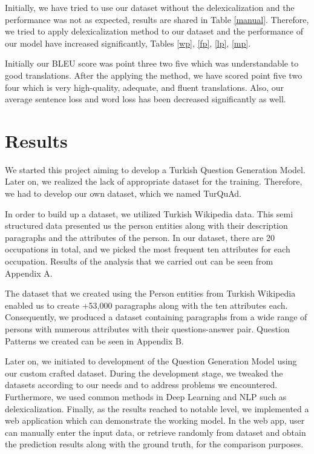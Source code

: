 \documentclass{mefsdp}
\begin{document}
Initially, we have tried to use our dataset without the delexicalization and the performance was not as expected, results are shared in Table \ref{manual}. Therefore, we tried to apply delexicalization method to our dataset and the performance of our model have increased significantly, Tables \ref{wp}, \ref{fp}, \ref{lp}, \ref{mp}.\newline \par 

Initially our BLEU score was point three two five which was understandable to good translations. After the applying the method, we have scored point five two four which is very high-quality, adequate, and fluent translations. Also, our average sentence loss and word loss has been decreased significantly as well.

	\pagebreak
	\section{Results}
	We started this project aiming to develop a Turkish Question Generation Model. Later on, we realized the lack of appropriate dataset for the training. Therefore, we had to develop our own dataset, which we named TurQuAd.  \newline \par
	
	In order to build up a dataset, we utilized Turkish Wikipedia data. This semi structured data presented us the person entities along with their description paragraphs and the attributes of the person. In our dataset, there are 20 occupations in total, and we picked the most frequent ten attributes for each occupation. Results of the analysis that we carried out can be seen from Appendix A.\newline \par
	
	The dataset that we created using the Person entities from Turkish Wikipedia enabled us to create +53,000 paragraphs along with the ten attributes each. Consequently, we produced a dataset containing paragraphs from a wide range of persons with numerous attributes with their questions-answer pair. Question Patterns we created can be seen in Appendix B. \newline \par
	
	Later on, we initiated to development of the Question Generation Model using our custom crafted dataset. During the development stage, we tweaked the datasets according to our needs and to address problems we encountered. Furthermore, we used common methods in Deep Learning and NLP such as delexicalization. Finally, as the results reached to notable level, we implemented a web application which can demonstrate the working model. In the web app, user can manually enter the input data, or retrieve randomly from dataset and obtain the prediction results along with the ground truth, for the comparison purposes.
	\newline \par
	
\end{document}
